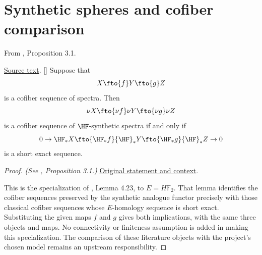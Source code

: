 \section{Synthetic spheres and cofiber comparison}



\begin{proposition}
\label{paper:3.1}
From \cite{LWX126}, Proposition 3.1.\par

\href{paper/main.tex.html#L759}{Source text}.
[{\cite[Lemma 4.23]{Pst}}]\label{prop:1f7950df}
    Suppose that
    $$X\fto{f} Y\fto{g} Z$$
    is a cofiber sequence of spectra. Then
    $$\nu X\fto{\nu f}\nu Y\fto{\nu g} \nu Z$$
    is a cofiber sequence of ${\HF}$-synthetic spectra if and only if
    $$0\to {\HF}_*X\fto{{\HF}_*f} {\HF}_*Y\fto{{\HF}_*g} {\HF}_*Z\to 0$$
    is a short exact sequence.



\end{proposition}
\begin{proof}
\textit{(See \cite{LWX126}, Proposition 3.1.)} \href{paper/main.tex.html#L759}{Original statement and context}.

This is the specialization of \cite{Pst}, Lemma 4.23, to $E=H\mathbb F_2$. That lemma identifies the cofiber sequences preserved by the synthetic analogue functor precisely with those classical cofiber sequences whose $E$-homology sequence is short exact. Substituting the given maps $f$ and $g$ gives both implications, with the same three objects and maps. No connectivity or finiteness assumption is added in making this specialization. The comparison of these literature objects with the project's chosen model remains an upstream responsibility.
\end{proof}

